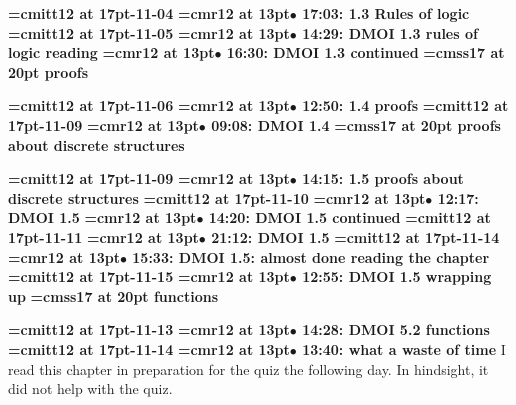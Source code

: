 {\medskip\noindent\bf\font\titlefont=cmitt12 at 17pt-11-04}\medskip
{\smallskip\noindent\bf\font\titlefont=cmr12 at 13pt\titlefont $\bullet$ 17:03: 1.3 Rules of logic}\smallskip
{\medskip\noindent\bf\font\titlefont=cmitt12 at 17pt-11-05}\medskip
{\smallskip\noindent\bf\font\titlefont=cmr12 at 13pt\titlefont $\bullet$ 14:29: DMOI 1.3 rules of logic reading}\smallskip
{\smallskip\noindent\bf\font\titlefont=cmr12 at 13pt\titlefont $\bullet$ 16:30: DMOI 1.3 continued}\smallskip
{}
{\medskip\noindent\bf\font\titlefont=cmss17 at 20pt proofs}\medskip

{\medskip\noindent\bf\font\titlefont=cmitt12 at 17pt-11-06}\medskip
{\smallskip\noindent\bf\font\titlefont=cmr12 at 13pt\titlefont $\bullet$ 12:50: 1.4 proofs}\smallskip
{\medskip\noindent\bf\font\titlefont=cmitt12 at 17pt-11-09}\medskip
{\smallskip\noindent\bf\font\titlefont=cmr12 at 13pt\titlefont $\bullet$ 09:08: DMOI 1.4}\smallskip
{}
{\medskip\noindent\bf\font\titlefont=cmss17 at 20pt proofs about discrete structures}\medskip

{\medskip\noindent\bf\font\titlefont=cmitt12 at 17pt-11-09}\medskip
{\smallskip\noindent\bf\font\titlefont=cmr12 at 13pt\titlefont $\bullet$ 14:15: 1.5 proofs about discrete structures}\smallskip
{\medskip\noindent\bf\font\titlefont=cmitt12 at 17pt-11-10}\medskip
{\smallskip\noindent\bf\font\titlefont=cmr12 at 13pt\titlefont $\bullet$ 12:17: DMOI 1.5}\smallskip
{\smallskip\noindent\bf\font\titlefont=cmr12 at 13pt\titlefont $\bullet$ 14:20: DMOI 1.5 continued}\smallskip
{\medskip\noindent\bf\font\titlefont=cmitt12 at 17pt-11-11}\medskip
{\smallskip\noindent\bf\font\titlefont=cmr12 at 13pt\titlefont $\bullet$ 21:12: DMOI 1.5}\smallskip
{\medskip\noindent\bf\font\titlefont=cmitt12 at 17pt-11-14}\medskip
{\smallskip\noindent\bf\font\titlefont=cmr12 at 13pt\titlefont $\bullet$ 15:33: DMOI 1.5: almost done reading the chapter}\smallskip
{\medskip\noindent\bf\font\titlefont=cmitt12 at 17pt-11-15}\medskip
{\smallskip\noindent\bf\font\titlefont=cmr12 at 13pt\titlefont $\bullet$ 12:55: DMOI 1.5 wrapping up}\smallskip
{}
{\medskip\noindent\bf\font\titlefont=cmss17 at 20pt functions}\medskip

{\medskip\noindent\bf\font\titlefont=cmitt12 at 17pt-11-13}\medskip
{\smallskip\noindent\bf\font\titlefont=cmr12 at 13pt\titlefont $\bullet$ 14:28: DMOI 5.2 functions}\smallskip
{\medskip\noindent\bf\font\titlefont=cmitt12 at 17pt-11-14}\medskip
{\smallskip\noindent\bf\font\titlefont=cmr12 at 13pt\titlefont $\bullet$ 13:40: what a waste of time}\smallskip
I read this chapter in preparation for the quiz the following day. In hindsight, it did not help with the quiz.
\par

